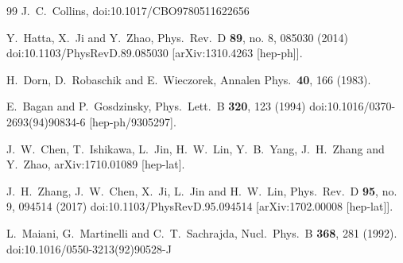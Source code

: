 \begin{thebibliography}{99}
  J.~C.~Collins,
  doi:10.1017/CBO9780511622656


  Y.~Hatta, X.~Ji and Y.~Zhao,
  Phys.\ Rev.\ D {\bf 89}, no. 8, 085030 (2014)
  doi:10.1103/PhysRevD.89.085030
  [arXiv:1310.4263 [hep-ph]].


  H.~Dorn, D.~Robaschik and E.~Wieczorek,
  Annalen Phys.\  {\bf 40}, 166 (1983).


  E.~Bagan and P.~Gosdzinsky,
  Phys.\ Lett.\ B {\bf 320}, 123 (1994)
  doi:10.1016/0370-2693(94)90834-6
  [hep-ph/9305297].


  J.~W.~Chen, T.~Ishikawa, L.~Jin, H.~W.~Lin, Y.~B.~Yang, J.~H.~Zhang and Y.~Zhao,
  arXiv:1710.01089 [hep-lat].

  J.~H.~Zhang, J.~W.~Chen, X.~Ji, L.~Jin and H.~W.~Lin,
  Phys.\ Rev.\ D {\bf 95}, no. 9, 094514 (2017)
  doi:10.1103/PhysRevD.95.094514
  [arXiv:1702.00008 [hep-lat]].


  L.~Maiani, G.~Martinelli and C.~T.~Sachrajda,
  Nucl.\ Phys.\ B {\bf 368}, 281 (1992).
  doi:10.1016/0550-3213(92)90528-J


\end{thebibliography}

